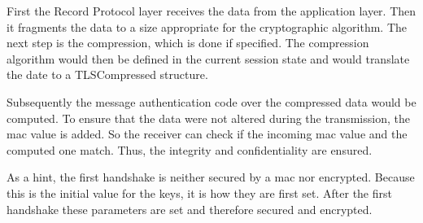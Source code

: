 First the Record Protocol layer receives the data from the application layer. Then it fragments the data to a size appropriate for the cryptographic algorithm. 
The next step is the compression, which is done if specified. The compression algorithm would then be defined in the current session state and would translate the date to a TLSCompressed structure.
 
Subsequently the message authentication code over the compressed data would be computed.
To ensure that the data were not altered during the transmission, the \gls{mac} value is added. So the receiver can check if the incoming \gls{mac} value and the computed one 
match. Thus, the integrity and confidentiality are ensured.

As a hint, the first handshake is neither secured by a \gls{mac} nor encrypted. Because this is the initial value for the keys, it is how they are first set. After the first handshake these parameters are set and therefore secured and encrypted.
\cite{ms:Record} \cite{Hassenstein}